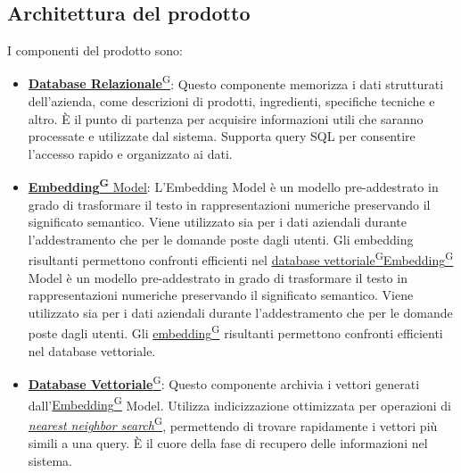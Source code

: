 \subsection{Architettura del prodotto}
I componenti del prodotto sono:
\begin{itemize}
    \item \href{https://code7crusaders.github.io/docs/RTB/documentazione_interna/glossario.html#database-relazionale}{\textbf{Database Relazionale}\textsuperscript{G}}:  
    Questo componente memorizza i dati strutturati dell’azienda, come descrizioni di prodotti, ingredienti, specifiche tecniche e altro. È il punto di partenza per acquisire informazioni utili che saranno processate e utilizzate dal sistema. Supporta query SQL per consentire l'accesso rapido e organizzato ai dati.
    
    \item \href{https://code7crusaders.github.io/docs/RTB/documentazione_interna/glossario.html#embedding}{\textbf{Embedding\textsuperscript{G}} Model}:  
    L’Embedding Model è un modello pre-addestrato in grado di trasformare il testo in rappresentazioni numeriche preservando il significato semantico. Viene utilizzato sia per i dati aziendali durante l’addestramento che per le domande poste dagli utenti. Gli embedding risultanti permettono confronti efficienti nel \href{https://code7crusaders.github.io/docs/RTB/documentazione_interna/glossario.html#database-vettoriale}{database vettoriale\textsuperscript{G}}\href{https://code7crusaders.github.io/docs/RTB/documentazione_interna/glossario.html#embedding}{Embedding\textsuperscript{G}} Model è un modello pre-addestrato in grado di trasformare il testo in rappresentazioni numeriche preservando il significato semantico. Viene utilizzato sia per i dati aziendali durante l’addestramento che per le domande poste dagli utenti. Gli \href{https://code7crusaders.github.io/docs/RTB/documentazione_interna/glossario.html#embedding}{embedding\textsuperscript{G}} risultanti permettono confronti efficienti nel database vettoriale.
    
    \item \href{https://code7crusaders.github.io/docs/RTB/documentazione_interna/glossario.html#database-vettoriale}{\textbf{Database Vettoriale}\textsuperscript{G}}:  
    Questo componente archivia i vettori generati dall’\href{https://code7crusaders.github.io/docs/RTB/documentazione_interna/glossario.html#embedding}{Embedding\textsuperscript{G}} Model. Utilizza indicizzazione ottimizzata per operazioni di \href{https://code7crusaders.github.io/docs/RTB/documentazione_interna/glossario.html#nearest-neighbor-search-nns}{\textit{nearest neighbor search}\textsuperscript{G}}, permettendo di trovare rapidamente i vettori più simili a una query. È il cuore della fase di recupero delle informazioni nel sistema.
    

\end{itemize}
